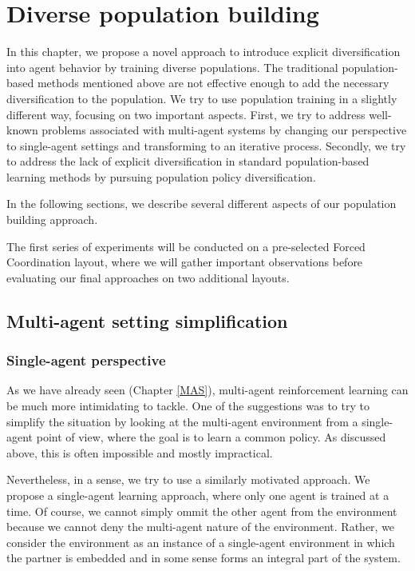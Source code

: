 \chapter{Diverse population building}\label{DiversePopulationMethodChapter}
In this chapter, we propose a novel approach to introduce explicit diversification into agent behavior by training diverse populations.
The traditional population-based methods mentioned above are not effective enough to add the necessary diversification to the population.
We try to use population training in a slightly different way, focusing on two important aspects.
First, we try to address well-known problems associated with multi-agent systems by changing our perspective to single-agent settings and transforming to an iterative process.
Secondly, we try to address the lack of explicit diversification in standard population-based learning methods by pursuing population policy diversification.

In the following sections, we describe several different aspects of our population building approach.

The first series of experiments will be conducted on a pre-selected Forced Coordination layout, where we will gather important observations before evaluating our final approaches on two additional layouts.


\section{Multi-agent setting simplification}

\subsection{Single-agent perspective}
As we have already seen (Chapter \ref{MAS}), multi-agent reinforcement learning can be much more intimidating to tackle.
One of the suggestions was to try to simplify the situation by looking at the multi-agent environment from a single-agent point of view, where the goal is to learn a common policy.
As discussed above, this is often impossible and mostly impractical.

Nevertheless, in a sense, we try to use a similarly motivated approach.
We propose a single-agent learning approach, where only one agent is trained at a time.
Of course, we cannot simply ommit the other agent from the environment because we cannot deny the multi-agent nature of the environment.
Rather, we consider the environment as an instance of a single-agent environment in which the partner is embedded and in some sense forms an integral part of the system.

